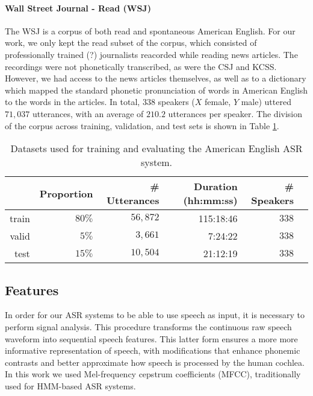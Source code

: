 \paragraph{Wall Street Journal - Read (WSJ)}
The WSJ \cite{} is a corpus of both read and spontaneous American English.
For our work, we only kept the read subset of the corpus, which consisted of {\color{red}professionally trained (?) journalists} reacorded while reading news articles. The recordings were not phonetically transcribed, as were the CSJ and KCSS. However, we had access to the news articles themselves, as well as to a dictionary which mapped the standard phonetic pronunciation of words in American English to the words in the articles.
In total, $338$ speakers {\color{red}($X$ female, $Y$ male)} uttered $71,037$ utterances, with an average of $210.2$ utterances per speaker. The division of the corpus across training, validation, and test sets is shown in Table \ref{tab:hmm_wsj}. 

\begin{table}[htb]
\centering
\caption{Datasets used for training and evaluating the American English ASR system.}
\label{tab:hmm_wsj}
\vspace{0.25cm}
\begin{tabular}{rrrrrr}
  \toprule
      & Proportion & \# Utterances & Duration (hh:mm:ss) & \# Speakers &  \\ \midrule
  train & $80\%$ &  $56,872$ &   115:18:46   &   $338$    &  \\
  valid & $5\%$ &  $3,661$ &  7:24:22  &  $338$  &  \\
  test  & $15\%$ &  $10,504$ & 21:12:19  & $338$    & \\ \bottomrule
\end{tabular}
\end{table}
      
\subsection{Features}
In order for our ASR systems to be able to use speech as input, it is necessary to perform signal analysis. This procedure transforms the continuous raw speech waveform into sequential speech features. This latter form ensures a more more informative representation of speech, with modifications that enhance phonemic contrasts and better approximate how speech is processed by the human cochlea. In this work we used Mel-frequency cepstrum coefficients (MFCC), traditionally used for HMM-based ASR systems.

